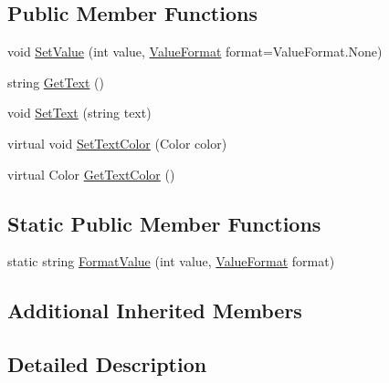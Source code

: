 \subsection*{Public Member Functions}
\begin{DoxyCompactItemize}
\item 
void \hyperlink{class_unity_engine_1_1_u_i_1_1_windows_1_1_components_1_1_text_component_a6c3b424df3a85387992f1865eba9745b}{Set\+Value} (int value, \hyperlink{class_unity_engine_1_1_u_i_1_1_windows_1_1_components_1_1_text_component_adf4a7bac85dfe1b32ebe6309e5386f89}{Value\+Format} format=Value\+Format.\+None)
\item 
string \hyperlink{class_unity_engine_1_1_u_i_1_1_windows_1_1_components_1_1_text_component_aabb06be0d621451f031db3aeca59a992}{Get\+Text} ()
\item 
void \hyperlink{class_unity_engine_1_1_u_i_1_1_windows_1_1_components_1_1_text_component_ad696e711c26d84896c66a34d41f9f6e3}{Set\+Text} (string text)
\item 
virtual void \hyperlink{class_unity_engine_1_1_u_i_1_1_windows_1_1_components_1_1_text_component_acb8e01ca832162bddfa910fa438f34fc}{Set\+Text\+Color} (Color color)
\item 
virtual Color \hyperlink{class_unity_engine_1_1_u_i_1_1_windows_1_1_components_1_1_text_component_aff6863e012dfc31af31b22e6d8b50b7f}{Get\+Text\+Color} ()
\end{DoxyCompactItemize}
\subsection*{Static Public Member Functions}
\begin{DoxyCompactItemize}
\item 
static string \hyperlink{class_unity_engine_1_1_u_i_1_1_windows_1_1_components_1_1_text_component_ab25cf31d544870c7b18bb585358e650b}{Format\+Value} (int value, \hyperlink{class_unity_engine_1_1_u_i_1_1_windows_1_1_components_1_1_text_component_adf4a7bac85dfe1b32ebe6309e5386f89}{Value\+Format} format)
\end{DoxyCompactItemize}
\subsection*{Additional Inherited Members}


\subsection{Detailed Description}


